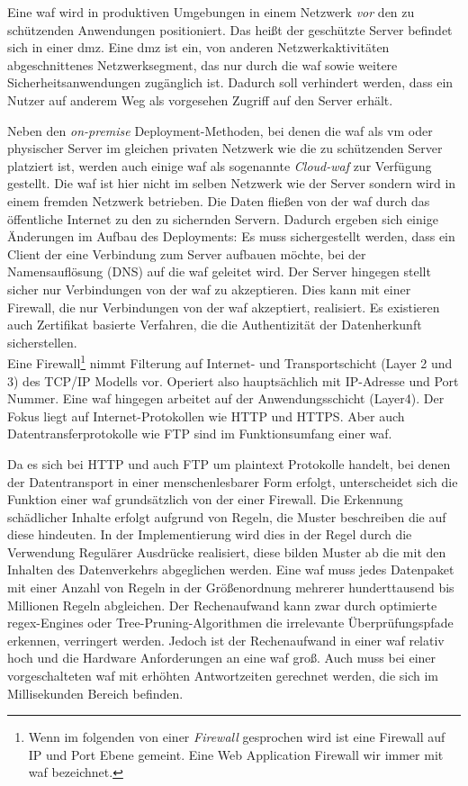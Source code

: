 Eine \ac{waf} wird in produktiven Umgebungen in einem Netzwerk \textit{vor} den zu schützenden Anwendungen positioniert.
Das heißt der geschützte Server befindet sich in einer \ac{dmz}.
Eine \ac{dmz} ist ein, von anderen Netzwerkaktivitäten abgeschnittenes Netzwerksegment, das nur durch die \ac{waf} sowie weitere Sicherheitsanwendungen zugänglich ist.
Dadurch soll verhindert werden, dass ein Nutzer auf anderem Weg als vorgesehen Zugriff auf den Server erhält.

Neben den \textit{on-premise} Deployment-Methoden, bei denen die \ac{waf} als \ac{vm} oder physischer Server im gleichen privaten Netzwerk wie die zu schützenden Server platziert ist, werden auch einige \ac{waf} als sogenannte \textit{Cloud-\ac{waf}} zur Verfügung gestellt.
Die \ac{waf} ist hier nicht im selben Netzwerk wie der Server sondern wird in einem fremden Netzwerk betrieben.
Die Daten fließen von der \ac{waf} durch das öffentliche Internet zu den zu sichernden Servern.
Dadurch ergeben sich einige Änderungen im Aufbau des Deployments:
Es muss sichergestellt werden, dass ein Client der eine Verbindung zum Server aufbauen möchte, bei der Namensauflösung (DNS) auf die \ac{waf} geleitet wird.
Der Server hingegen stellt sicher nur Verbindungen von der \ac{waf} zu akzeptieren.
Dies kann mit einer Firewall, die nur Verbindungen von der \ac{waf} akzeptiert, realisiert.
Es existieren auch Zertifikat basierte Verfahren, die die Authentizität der Datenherkunft sicherstellen.\\

Eine Firewall\footnote{Wenn im folgenden von einer \textit{Firewall} gesprochen wird ist eine Firewall auf IP und Port Ebene gemeint. Eine Web Application Firewall wir immer mit \ac{waf} bezeichnet.} nimmt Filterung auf Internet- und Transportschicht (Layer 2 und 3) des TCP/IP Modells vor.
Operiert also hauptsächlich mit IP-Adresse und Port Nummer.
Eine \ac{waf} hingegen arbeitet auf der Anwendungsschicht (Layer4).
Der Fokus liegt auf Internet-Protokollen wie HTTP und HTTPS. 
Aber auch Datentransferprotokolle wie FTP sind im Funktionsumfang einer \ac{waf}.

Da es sich bei HTTP und auch FTP um plaintext Protokolle handelt, bei denen der Datentransport in einer menschenlesbarer Form erfolgt, unterscheidet sich die Funktion einer \ac{waf} grundsätzlich von der einer Firewall.
Die Erkennung schädlicher Inhalte erfolgt aufgrund von Regeln, die Muster beschreiben die auf diese hindeuten.
In der Implementierung wird dies in der Regel durch die Verwendung Regulärer Ausdrücke realisiert, diese bilden Muster ab die mit den Inhalten des Datenverkehrs abgeglichen werden.
Eine \ac{waf} muss jedes Datenpaket mit einer Anzahl von Regeln in der Größenordnung mehrerer hunderttausend bis Millionen Regeln abgleichen.
Der Rechenaufwand kann zwar durch optimierte regex-Engines oder Tree-Pruning-Algorithmen die irrelevante Überprüfungspfade erkennen, verringert werden.
Jedoch ist der Rechenaufwand in einer \ac{waf} relativ hoch und die Hardware Anforderungen an eine \ac{waf} groß.
Auch muss bei einer vorgeschalteten \ac{waf} mit erhöhten Antwortzeiten gerechnet werden, die sich im Millisekunden Bereich befinden.

